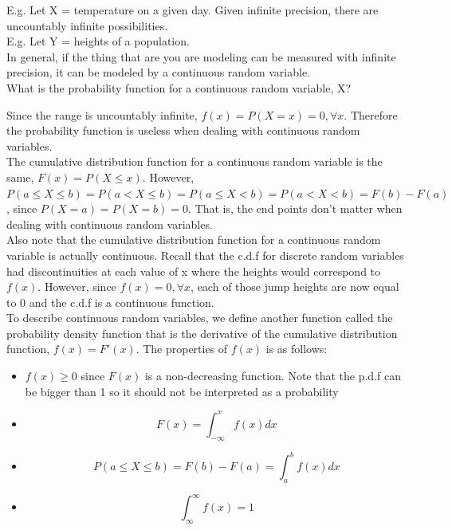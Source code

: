 \documentclass[12pt, letterpaper]{article}
\begin{document}
E.g. Let X = temperature on a given day. Given infinite precision, there are uncountably infinite possibilities.\\

E.g. Let Y = heights of a population.\\

In general, if the thing that are you are modeling can be measured with infinite precision, it can be modeled by a continuous random variable.\\

What is the probability function for a continuous random variable, X?

Since the range is uncountably infinite, \(f\left(x\right) = P\left(X = x\right) = 0,  \forall x\). Therefore the probability function is useless when dealing with continuous random variables.\\

The cumulative distribution function for a continuous random variable is the same, \(F\left(x\right) = P\left(X \leq x\right)\). However, \(P\left(a \leq X \leq b\right) = P\left(a < X \leq b\right) = P\left(a \leq X < b\right) = P\left(a < X < b\right) = F\left(b\right) - F\left(a\right)\), since \(P\left(X = a\right) = P\left(X = b\right) = 0\). That is, the end points don't matter when dealing with continuous random variables.\\

Also note that the cumulative distribution function for a continuous random variable is actually continuous. Recall that the c.d.f for discrete random variables had discontinuities at each value of x where the heights would correspond to \(f\left(x\right)\). However, since \(f\left(x\right) = 0, \forall x\), each of those jump heights are now equal to 0 and the c.d.f is a continuous function.\\

To describe continuous random variables, we define another function called the probability density function that is the derivative of the cumulative distribution function, \(f\left(x\right) = F'\left(x\right)\). The properties of \(f\left(x\right)\) is as follows:
\begin{itemize}
\item \(f\left(x\right) \geq 0\) since \(F\left(x\right)\) is a non-decreasing function. Note that the p.d.f can be bigger than 1 so it should not be interpreted as a probability
\item $$F\left(x\right) = \int_{- \infty}^{x} f\left(x\right)dx$$
\item $$P\left(a \leq X \leq b\right) = F\left(b\right) - F\left(a\right) = \int_{a}^{b} f\left(x\right)dx$$
\item $$\int_{\infty}^{\infty} f\left(x\right) = 1$$
\end{itemize}
\end{document}
